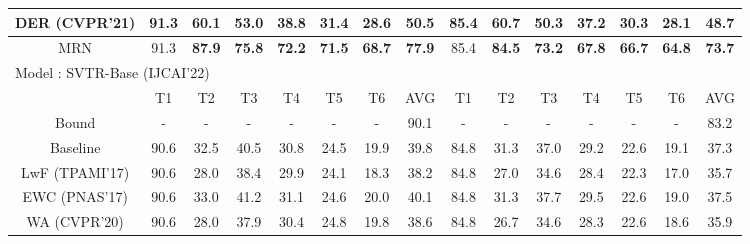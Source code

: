 \documentclass[10pt,twocolumn,letterpaper]{article}
\begin{document}
\begin{table*}[]
\begin{center}
{\begin{tabular}{ccccccccccccccc}
\multicolumn{1}{c|}{DER (CVPR'21)\cite{Yan2021DER}}      & 91.3 & 60.1          & 53.0          & 38.8          & 31.4          & 28.6          & \multicolumn{1}{c|}{50.5}          & 85.4 & 60.7          & 50.3          & 37.2          & 30.3          & 28.1          & 48.7          \\ \hline
\multicolumn{1}{c|}{MRN}     & 91.3 & \textbf{87.9} & \textbf{75.8} & \textbf{72.2} & \textbf{71.5} & \textbf{68.7} & \multicolumn{1}{c|}{\textbf{77.9}} & 85.4 & \textbf{84.5} & \textbf{73.2} & \textbf{67.8} & \textbf{66.7} & \textbf{64.8} & \textbf{73.7} \\ \hline
\hline
\multicolumn{15}{l}{Model : SVTR-Base (IJCAI'22) \cite{du2022@svtr}}                                         \\ \hline
\multicolumn{1}{c|}{}         & T1   & T2            & T3            & T4            & T5            & T6            & \multicolumn{1}{c|}{AVG}           & T1   & T2            & T3            & T4            & T5            & T6            & AVG           \\ \hline
\multicolumn{1}{c|}{Bound}    & -    & -             & -             & -             & -             & -             & \multicolumn{1}{c|}{90.1}          & -    & -             & -             & -             & -             & -             & 83.2          \\
\multicolumn{1}{c|}{Baseline} & 90.6 & 32.5          & 40.5          & 30.8          & 24.5          & 19.9          & \multicolumn{1}{c|}{39.8}          & 84.8 & 31.3          & 37.0          & 29.2          & 22.6          & 19.1          & 37.3          \\ \hline
\multicolumn{1}{c|}{LwF (TPAMI'17)\cite{Li2017LWF}}      & 90.6 & 28.0          & 38.4          & 29.9          & 24.1          & 18.3          & \multicolumn{1}{c|}{38.2}          & 84.8 & 27.0          & 34.6          & 28.4          & 22.3          & 17.0          & 35.7          \\
\multicolumn{1}{c|}{EWC (PNAS'17)\cite{kirkpatrick2017ewc}}      & 90.6 & 33.0          & 41.2          & 31.1          & 24.6          & 20.0          & \multicolumn{1}{c|}{40.1}          & 84.8 & 31.3          & 37.7          & 29.5          & 22.6          & 19.0          & 37.5          \\
\multicolumn{1}{c|}{WA  (CVPR'20) \cite{zhao2020wa}}       & 90.6 & 28.0          & 37.9          & 30.4          & 24.8          & 19.8          & \multicolumn{1}{c|}{38.6}          & 84.8 & 26.7          & 34.6          & 28.3          & 22.6          & 18.6          & 35.9          \\

\end{tabular}}
\end{center}
\end{table*}
\end{document}
